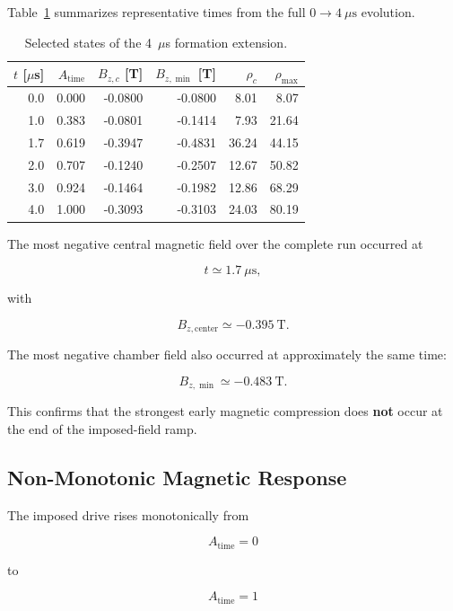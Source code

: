 \documentclass[11pt,a4paper]{article}
\begin{document}
Table~\ref{tab:formation4us_selected} summarizes representative times from the
full \(0\rightarrow4~\mu\mathrm{s}\) evolution.

\begin{table}[htbp]
    \centering
    \small
    \caption{Selected states of the 4~$\mu$s formation extension.}
    \label{tab:formation4us_selected}
    \begin{tabular}{@{}rrrrrr@{}}
        \toprule
        \(t\) [$\mu$s] &
        \(A_{\mathrm{time}}\) &
        \(B_{z,c}\) [T] &
        \(B_{z,\min}\) [T] &
        \(\rho_c\) &
        \(\rho_{\max}\) \\
        \midrule
        0.0 & 0.000 & -0.0800 & -0.0800 &  8.01 &  8.07 \\
        1.0 & 0.383 & -0.0801 & -0.1414 &  7.93 & 21.64 \\
        1.7 & 0.619 & -0.3947 & -0.4831 & 36.24 & 44.15 \\
        2.0 & 0.707 & -0.1240 & -0.2507 & 12.67 & 50.82 \\
        3.0 & 0.924 & -0.1464 & -0.1982 & 12.86 & 68.29 \\
        4.0 & 1.000 & -0.3093 & -0.3103 & 24.03 & 80.19 \\
        \bottomrule
    \end{tabular}
\end{table}

The most negative central magnetic field over the complete run occurred at

\[
t\simeq1.7~\mu\mathrm{s},
\]

with

\[
B_{z,\mathrm{center}}
\simeq
-0.395~\mathrm{T}.
\]

The most negative chamber field also occurred at approximately the same time:

\[
B_{z,\min}
\simeq
-0.483~\mathrm{T}.
\]

This confirms that the strongest early magnetic compression does
\textbf{not} occur at the end of the imposed-field ramp.

\subsection{Non-Monotonic Magnetic Response}

The imposed drive rises monotonically from

\[
A_{\mathrm{time}}=0
\]

to

\[
A_{\mathrm{time}}=1
\]
\end{document}
